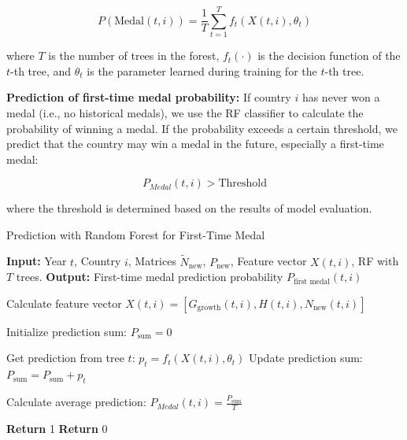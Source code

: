 \documentclass{mcmthesis}
\begin{document}
	\[
	P(\text{Medal}(t,i)) = \frac{1}{T} \sum_{t=1}^{T} f_t(X(t,i), \theta_t)
	\]
	
	where \( T \) is the number of trees in the forest, \( f_t(\cdot) \) is the decision function of the \( t \)-th tree, and \( \theta_t \) is the parameter learned during training for the \( t \)-th tree.
	
	\textbf{Prediction of first-time medal probability:}  
	If country \( i \) has never won a medal (i.e., no historical medals), we use the RF classifier to calculate the probability of winning a medal. If the probability exceeds a certain threshold, we predict that the country may win a medal in the future, especially a first-time medal:
	
	\[
	P_{Medal}(t,i) > \text{Threshold}
	\]
	
	where the threshold is determined based on the results of model evaluation.
	\begin{algorithm}
		\caption{Prediction with Random Forest for First-Time Medal}
		\begin{algorithmic}[1]
			\State \textbf{Input:} Year \( t \), Country \( i \), Matrices \( \tilde{N}_{\text{new}} \), \( P_{\text{new}} \), Feature vector \( X(t,i) \), RF with \( T \) trees.
			\State \textbf{Output:} First-time medal prediction probability \( P_{\text{first medal}}(t,i) \)
			
			\State Calculate feature vector \( X(t,i) = [G_{\text{growth}}(t,i), H(t,i), N_{\text{new}}(t,i)] \)
			
			\State Initialize prediction sum: \( P_{\text{sum}} = 0 \)
			
			\State Get prediction from tree \( t \): \( p_t = f_t(X(t,i), \theta_t) \)
			\State Update prediction sum: \( P_{\text{sum}} = P_{\text{sum}} + p_t \)
			\EndFor
			
			\State Calculate average prediction: \( P_{Medal}(t,i)  = \frac{P_{\text{sum}}}{T} \)
			
			\State \textbf{Return} 1 
			\Else
			\State \textbf{Return} 0 
			\EndIf
		\end{algorithmic}
	\end{algorithm}
	
	
	
	
	
	
	
	
	
\end{document}
